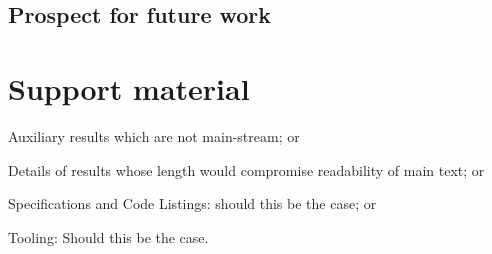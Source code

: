 \documentclass[a4paper]{report}
\begin{document}
	\section{Prospect for future work}
	

	

	
	
	
	\chapter{Support material}
	Auxiliary results which are not main-stream; or

	Details of results whose length would compromise readability of main text; or

	Specifications and Code Listings: should this be the case; or

	Tooling: Should this be the case.



\end{document}
